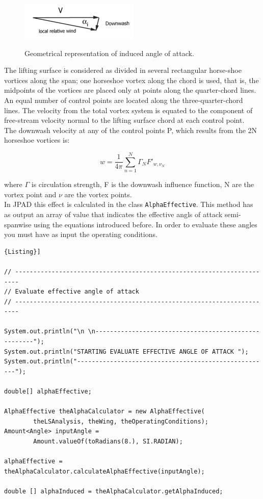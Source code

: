 \begin{figure}[H]
\centering
{\includegraphics[height=1.8cm]{Immagini/atg}} 
\caption{Geometrical representation of induced angle of attack.}
\end{figure}

The lifting surface is considered as divided in several rectangular horse-shoe vortices along the span; one horseshoe vortex along the chord is used, that is, the midpoints of the vortices are placed only at points along the quarter-chord lines. An equal number of control points are located along the three-quarter-chord lines. The velocity from the total vortex system is equated to the component of free-stream velocity normal to the lifting surface chord at each control point.\\
The downwash velocity at any of the control points P, which results from the 2N horseshoe vortices is:

\begin{equation}
w = \frac{1}{4\pi} \sum_{n=1}^N \Gamma_N F'_{w,\nu_N}
\end{equation}

where $\Gamma$ is circulation strength, F is the downwash influence function, N are the vortex point and $\nu$ are the vortex points.\\
In JPAD this effect is calculated in the class \texttt{AlphaEffective}.
This method has as output an array of value that indicates the effective angls of attack semi-spanwise using the equations introduced before. In order to evaluate these angles you must have as input the operating conditions. 

\begin{lstlisting}[frame=rbl,caption={{\footnotesize Effective angle of attack Test Class}},label= [style=\bfseries]{Listing}]

// -----------------------------------------------------------------------
// Evaluate effective angle of attack
// -----------------------------------------------------------------------

System.out.println("\n \n-----------------------------------------------------");
System.out.println("STARTING EVALUATE EFFECTIVE ANGLE OF ATTACK ");
System.out.println("-----------------------------------------------------");

double[] alphaEffective;

AlphaEffective theAlphaCalculator = new AlphaEffective(
		theLSAnalysis, theWing, theOperatingConditions);
Amount<Angle> inputAngle = 
		Amount.valueOf(toRadians(8.), SI.RADIAN);

alphaEffective = theAlphaCalculator.calculateAlphaEffective(inputAngle);

double [] alphaInduced = theAlphaCalculator.getAlphaInduced;

\end{lstlisting}

